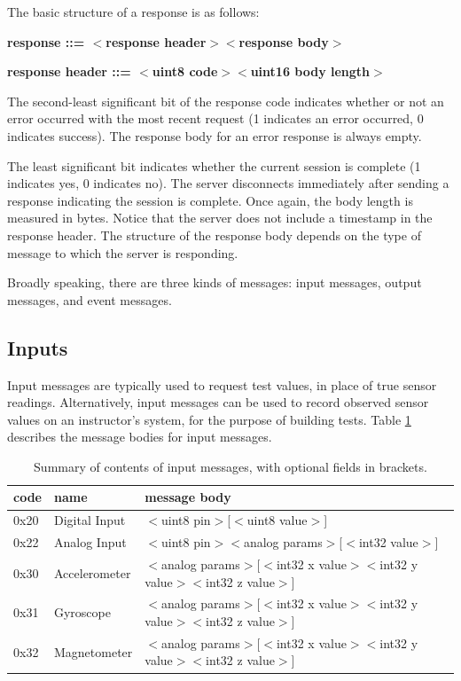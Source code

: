 \documentclass[12pt]{article}
\begin{document}
\begin{appendices}
\noindent The basic structure of a response is as follows:

\textbf{response ::= $<$response header$>$$<$response body$>$}

\textbf{response header ::= $<$uint8 code$>$$<$uint16 body length$>$}

\noindent The second-least significant bit of the response code indicates whether or not an error occurred with the most recent request (1 indicates an error occurred, 0 indicates success).  The response body for an error response is always empty.

The least significant bit indicates whether the current session is complete (1 indicates yes, 0 indicates no).  The server disconnects immediately after sending a response indicating the session is complete.  Once again, the body length is measured in bytes.  Notice that the server does not include a timestamp in the response header.  The structure of the response body depends on the type of message to which the server is responding.

Broadly speaking, there are three kinds of messages: input messages, output messages, and event messages.

\subsection{Inputs}
Input messages are typically used to request test values, in place of true sensor readings.  Alternatively, input messages can be used to record observed sensor values on an instructor's system, for the purpose of building tests.  Table \ref{table:input-messages} describes the message bodies for input messages.

\begin{table}[ht]
\begin{center}
\begin{tabular}{l l l}
code & name & message body \\ \hline
0x20 & Digital Input & $<$uint8 pin$>$[$<$uint8 value$>$] \\
0x22 & Analog Input & $<$uint8 pin$>$$<$analog params$>$[$<$int32 value$>$] \\
0x30 & Accelerometer & $<$analog params$>$[$<$int32 x value$>$$<$int32 y value$>$$<$int32 z value$>$] \\
0x31 & Gyroscope & $<$analog params$>$[$<$int32 x value$>$$<$int32 y value$>$$<$int32 z value$>$] \\
0x32 & Magnetometer & $<$analog params$>$[$<$int32 x value$>$$<$int32 y value$>$$<$int32 z value$>$] \\ \hline
\end{tabular}
\caption{Summary of contents of input messages, with optional fields in brackets.}
\label{table:input-messages}
\end{center}
\end{table}


\end{appendices}
\end{document}
